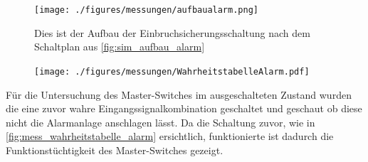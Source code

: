 \documentclass[12pt,english,ngerman]{scrartcl}
\begin{document}
\begin{figure}[H]
  \centering
    \texttt{[image: ./figures/messungen/aufbaualarm.png]}
  \caption{Dies ist der Aufbau der Einbruchsicherungsschaltung nach dem
  Schaltplan aus \autoref{fig:sim_aufbau_alarm}}
  \label{fig:mess_aufbau_alarm}
\end{figure}


\begin{figure}[H]
  \centering
    \texttt{[image: ./figures/messungen/WahrheitstabelleAlarm.pdf]}
  \caption{}
  \label{fig:mess_wahrheitstabelle_alarm}
\end{figure}

Für die Untersuchung des Master-Switches im ausgeschalteten Zustand wurden die
eine zuvor wahre Eingangssignalkombination geschaltet und geschaut ob diese
nicht die Alarmanlage anschlagen lässt. Da die Schaltung zuvor, wie in
\autoref{fig:mess_wahrheitstabelle_alarm} ersichtlich, funktionierte ist
dadurch die Funktionstüchtigkeit des Master-Switches gezeigt.


\end{document}
